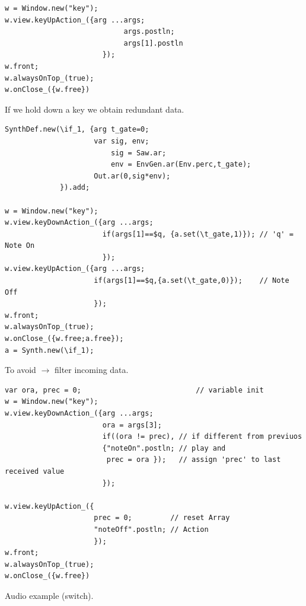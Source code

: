 \begin{lstlisting}[frame=single, caption=keyUpAction model] 
w = Window.new("key");
w.view.keyUpAction_({arg ...args;
                            args.postln;
                            args[1].postln
                       });
w.front;
w.alwaysOnTop_(true);
w.onClose_({w.free})
\end{lstlisting} 

If we hold down a key we obtain redundant data.

\begin{lstlisting}[frame=single] 
SynthDef.new(\if_1, {arg t_gate=0;
                     var sig, env;
                         sig = Saw.ar;
                         env = EnvGen.ar(Env.perc,t_gate);
                     Out.ar(0,sig*env);
             }).add;

w = Window.new("key");
w.view.keyDownAction_({arg ...args;
	                   if(args[1]==$q, {a.set(\t_gate,1)}); // 'q' = Note On
                       });
w.view.keyUpAction_({arg ...args;
	                 if(args[1]==$q,{a.set(\t_gate,0)});    // Note Off
                     });
w.front;
w.alwaysOnTop_(true);
w.onClose_({w.free;a.free});
a = Synth.new(\if_1);
\end{lstlisting} 

To avoid \(\rightarrow\) filter incoming data.

\begin{lstlisting}[frame=single] 
var ora, prec = 0;                           // variable init
w = Window.new("key");
w.view.keyDownAction_({arg ...args;
                       ora = args[3];
                       if((ora != prec), // if different from previuos
                       {"noteOn".postln; // play and
                        prec = ora });   // assign 'prec' to last received value
                       });                   
					   
w.view.keyUpAction_({
                     prec = 0;         // reset Array 
                     "noteOff".postln; // Action
                     });            
w.front;
w.alwaysOnTop_(true);
w.onClose_({w.free})
\end{lstlisting} 

Audio example (switch).

